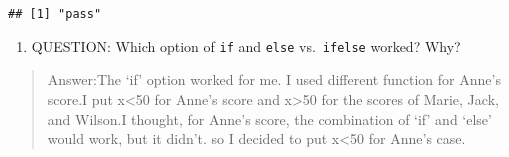 \documentclass[
]{article}
\providecommand{\tightlist}{%
  \setlength{\itemsep}{0pt}\setlength{\parskip}{0pt}}
\begin{document}
\begin{verbatim}
## [1] "pass"
\end{verbatim}

\begin{enumerate}
\def\labelenumi{\arabic{enumi}.}
\setcounter{enumi}{11}
\tightlist
\item
  QUESTION: Which option of \texttt{if} and \texttt{else}
  vs.~\texttt{ifelse} worked? Why?
\end{enumerate}

\begin{quote}
Answer:The `if' option worked for me. I used different function for
Anne's score.I put x\textless50 for Anne's score and x\textgreater50 for
the scores of Marie, Jack, and Wilson.I thought, for Anne's score, the
combination of `if' and `else' would work, but it didn't. so I decided
to put x\textless50 for Anne's case.
\end{quote}
\end{document}
